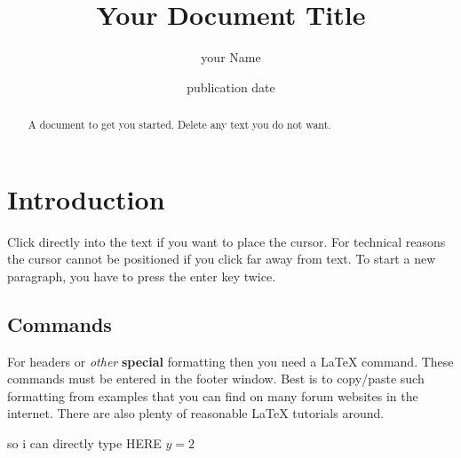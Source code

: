 \documentclass[a4paper, 11pt]{article}
\title{Your Document Title}
\author{your Name}
\date{publication date}
\begin{document}

\maketitle

\begin{abstract}
A document to get you started. Delete any text you do not want.
\end{abstract}

\section{Introduction}
Click directly into the text if you want to place the cursor. For technical reasons the cursor cannot be positioned if you click far away from text.  To start a new paragraph, you have to press the enter key twice.

\subsection{Commands}

For headers or \emph{other} \textbf{special} formatting then you need a  \LaTeX\xspace command. These commands must be entered in the footer window. Best is to copy/paste such formatting from examples that you can find on many forum websites in the internet. There are also plenty of reasonable  \LaTeX\xspace tutorials around.

so i can directly type HERE $y=2$ 


\end{document}
